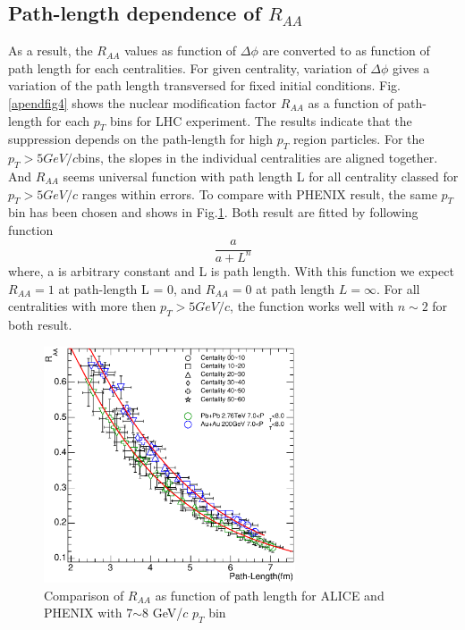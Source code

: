 	\subsection{Path-length dependence of $R_{AA}$}
	As a result, the $R_{AA}$ values as function of $\Delta \phi$ are converted to as function of path length for each centralities. For given centrality, variation of $\Delta \phi$ gives a variation of the path length transversed for fixed initial conditions. Fig.\ref{apendfig4} shows the nuclear modification factor $R_{AA}$ as a function of path-length for each $p_{T}$ bins for LHC experiment. The results indicate that the suppression depends on the path-length for high $p_T$ region particles. For the $p_T > 5GeV/c $bins, the slopes in the individual centralities are aligned together. And $R_{AA}$ seems universal function with path length L for all centrality classed for $p_T > 5GeV/c$ ranges within errors.  To compare with PHENIX result, the same $p_T$ bin has been chosen and shows in Fig.\ref{apenfig5}. Both result are fitted by following function
\begin{equation}
\frac{a}{a+L^n}
\end{equation}
where, a is arbitrary constant and L is path length. With this function we expect $R_{AA}= 1$ at path-length L = 0, and $R_{AA} = 0$ at path length $L = \infty$. For all centralities with more then $p_T > 5GeV/c$, the function works well with  $ n \sim 2 $ for both result.


\begin{figure}[htbp]
\begin{center}
\includegraphics[height=7cm]{figures/Fig_pathlength/fig10.eps}
\caption{Comparison of $R_{AA}$ as function of path length for ALICE and PHENIX with 7$\sim$8 GeV/$c$ $p_T$ bin  }
\label{apenfig5}
\end{center}
\end{figure}



